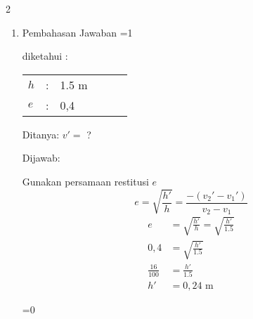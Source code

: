 \documentclass[10pt,a4paper]{article}
\newcommand\coret[2][red]{\renewcommand\CancelColor{\color{#1}}\cancel{#2}}
\def\tampilkunci{1}
\newcommand{\hide}[1]{\ifnum\tampilkunci=1
%
\begin{mybox}
 #1
\end{mybox}
%
\vspace{\baselineskip}\fi\ifnum\tampilkunci=0
%
%
\fi}
\begin{document}
\begin{multicols*}{2}
\begin{enumerate}
{Ditanya : $v_A'$  ?

Jawab:

Karena lenting sempurna maka berlaku
\begin{align*}
e &= \frac{-(v_2'-v_1')}{v_2-v_1}\\
1 &= \frac{-v_2'+v_1'}{-2,5-(5)}\\
1 &= \frac{-(v_2'-v_1')}{-7,5}\\
\coret{-}7,5 &= \coret{-}(v_2'-v_1')\\
7.5 &= v_2' -v_1'
\end{align*}
Berlaku pula persamaan kekekalan momentum, 
\begin{align*}
\Sigma p &= \Sigma p\\
{m_A}v_1 + {m_B}v_2 &= {m_A}v_1' + {m_B}v_2' \\
3(5)+2.(-2,5) &= 3v_1' +2v_2'\\
10 &= 3v_1' + 2v_2'
\end{align*}
Kemudian proses eliminasi sehingga 
\begin{align*}
7.5 &= v_2' -v_1'\\
10 &= 3v_1' + 2v_2'\\
\text{persamaan 1 dikali}&\text{ 2 dulu}\\
15 &=2v_2'-2v_1'\\
10 &= 3v_1'+2v_2'\\
\text{----}&\text{--------------(-)}\\
5 &= -5v_1'\\
v_1'&= -1 \text{ m/s}
\end{align*}
}


\item[27] Pembahasan Jawaban
\hide{
diketahui :

\begin{tabular}{p{0.5cm} p{1mm} p{2cm} p{1cm} p{0.5cm} p{2cm} }
$h$ &: &1.5 m  & & &\\
$e$ &: &0,4 & & & 
\end{tabular}

Ditanya: $v'=$ ?

Dijawab:

Gunakan persamaan restitusi $e$ 
$$ e = \sqrt{\frac{h'}{h}}=\frac{-(v_2'-v_1')}{v_2-v_1}$$
\begin{align*}
e&=\sqrt{\frac{h'}{h}}=\sqrt{\frac{h'}{1.5}}\\
0,4 &= \sqrt{\frac{h'}{1.5}}\\
\frac{16}{100} &=\frac{h'}{1.5}\\
h' &= 0,24 \text { m} 
\end{align*}
} 


\end{enumerate}
\end{multicols*}
\end{document}
